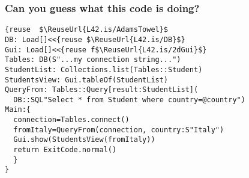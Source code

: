 
\begin{frame}[fragile]
\frametitle{Can you guess what this code is doing?}
\begin{NiceCode}{59ex}{1}
\begin{lstlisting}
{reuse  $\ReuseUrl{L42.is/AdamsTowel}$
DB: Load[]<<{reuse $\ReuseUrl{L42.is/DB}$}
Gui: Load[]<<{reuse f$\ReuseUrl{L42.is/2dGui}$}
Tables: DB(S"...my connection string...")
StudentList: Collections.list(Tables::Student)
StudentsView: Gui.tableOf(StudentList)
QueryFrom: Tables::Query[result:StudentList](
  DB::SQL"Select * from Student where country=@country")
Main:{
  connection=Tables.connect()
  fromItaly=QueryFrom(connection, country:S"Italy")
  Gui.show(StudentsView(fromItaly))
  return ExitCode.normal()
  }
}
\end{lstlisting}
\end{NiceCode}
\end{frame}



